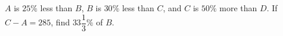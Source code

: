 $A$ is $25\%$ less than $B$, $B$ is $30\%$ less than $C$, and $C$ is $50\%$ more than $D$. If $C-A=285$, find $33\dfrac13\%$ of $B$.
